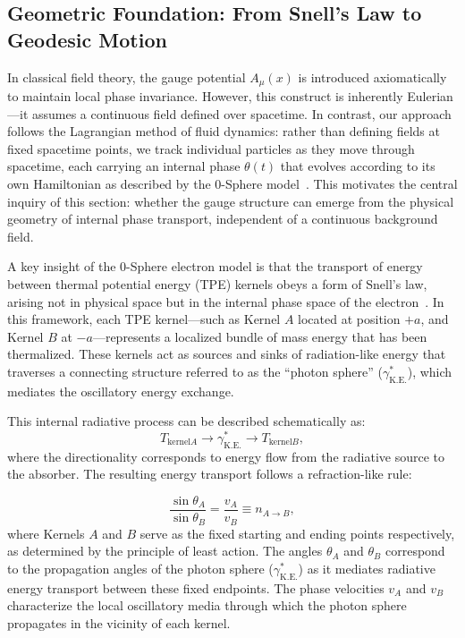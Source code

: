 \documentclass[%
 reprint,
 amsmath,amssymb,
 aps,
]{revtex4-1}
\numberwithin{equation}{section}%
\begin{document}
\subsection{Geometric Foundation: From Snell's Law to Geodesic Motion}

In classical field theory, the gauge potential $A_\mu(x)$ is introduced axiomatically to maintain local phase invariance. However, this construct is inherently Eulerian—it assumes a continuous field defined over spacetime. In contrast, our approach follows the Lagrangian method of fluid dynamics: rather than defining fields at fixed spacetime points, we track individual particles as they move through spacetime, each carrying an internal phase $\theta(t)$ that evolves according to its own Hamiltonian as described by the 0-Sphere model~\cite{hanamura2024quantum,hanamura2023}. This motivates the central inquiry of this section: whether the gauge structure can emerge from the physical geometry of internal phase transport, independent of a continuous background field.

A key insight of the 0-Sphere electron model is that the transport of energy between thermal potential energy (TPE) kernels obeys a form of Snell’s law, arising not in physical space but in the internal phase space of the electron~\cite{hanamura2024quantum}. In this framework, each TPE kernel—such as Kernel $A$ located at position $+a$, and Kernel $B$ at $-a$—represents a localized bundle of mass energy that has been thermalized. These kernels act as sources and sinks of radiation-like energy that traverses a connecting structure referred to as the “photon sphere” ($\gamma^*_{\mathrm{K.E.}}$), which mediates the oscillatory energy exchange.

This internal radiative process can be described schematically as:
\begin{equation}
T_{\mathrm{kernel}A} \rightarrow \gamma^*_{\mathrm{K.E.}} \rightarrow T_{\mathrm{kernel}B},
\end{equation}
where the directionality corresponds to energy flow from the radiative source to the absorber. The resulting energy transport follows a refraction-like rule:

\begin{equation}
\frac{\sin \theta_A}{\sin \theta_B} = \frac{v_A}{v_B} \equiv n_{A \to B},
\end{equation}
where Kernels $A$ and $B$ serve as the fixed starting and ending points respectively, as determined by the principle of least action. The angles $\theta_A$ and $\theta_B$ correspond to the propagation angles of the photon sphere ($\gamma^*_{\mathrm{K.E.}}$) as it mediates radiative energy transport between these fixed endpoints. The phase velocities $v_A$ and $v_B$ characterize the local oscillatory media through which the photon sphere propagates in the vicinity of each kernel.
\end{document}
